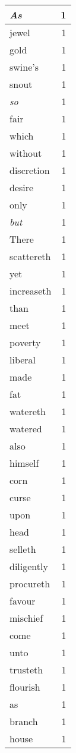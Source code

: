 \begin{center}
\begin{longtable}{l|r}
\emph{As} & 1\\ \hline 
jewel & 1\\ \hline 
gold & 1\\ \hline 
swine's & 1\\ \hline 
snout & 1\\ \hline 
\emph{so} & 1\\ \hline 
fair & 1\\ \hline 
which & 1\\ \hline 
without & 1\\ \hline 
discretion & 1\\ \hline 
desire & 1\\ \hline 
only & 1\\ \hline 
\emph{but} & 1\\ \hline 
There & 1\\ \hline 
scattereth & 1\\ \hline 
yet & 1\\ \hline 
increaseth & 1\\ \hline 
than & 1\\ \hline 
meet & 1\\ \hline 
poverty & 1\\ \hline 
liberal & 1\\ \hline 
made & 1\\ \hline 
fat & 1\\ \hline 
watereth & 1\\ \hline 
watered & 1\\ \hline 
also & 1\\ \hline 
himself & 1\\ \hline 
corn & 1\\ \hline 
curse & 1\\ \hline 
upon & 1\\ \hline 
head & 1\\ \hline 
selleth & 1\\ \hline 
diligently & 1\\ \hline 
procureth & 1\\ \hline 
favour & 1\\ \hline 
mischief & 1\\ \hline 
come & 1\\ \hline 
unto & 1\\ \hline 
trusteth & 1\\ \hline 
flourish & 1\\ \hline 
as & 1\\ \hline 
branch & 1\\ \hline 
house & 1\\ \hline 

\end{longtable}
\end{center}
